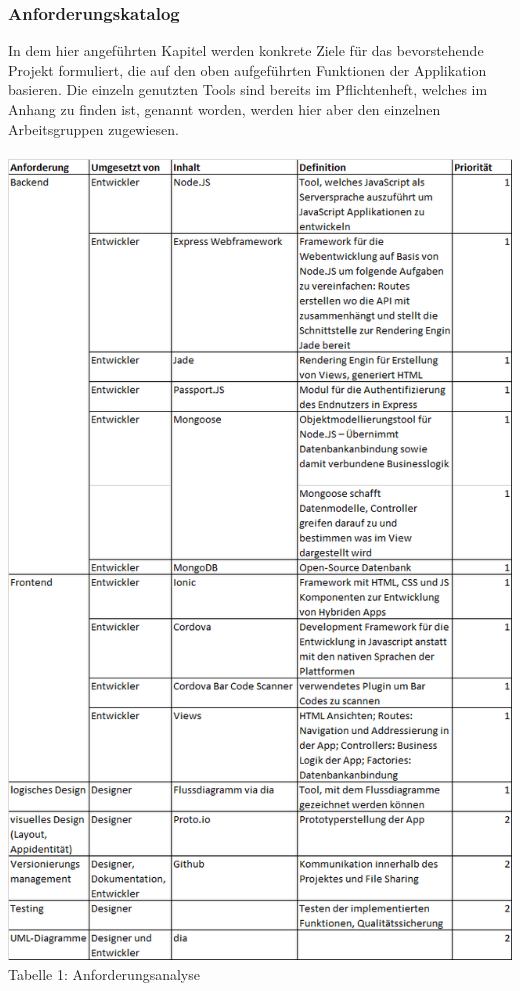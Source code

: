 \documentclass[12pt,a4paper]{article}
\begin{document}
\subsubsection{Anforderungskatalog}
In dem hier angeführten Kapitel werden konkrete Ziele für das bevorstehende Projekt formuliert, die auf den oben aufgeführten Funktionen der Applikation basieren.
Die einzeln genutzten Tools sind bereits im Pflichtenheft, welches im Anhang zu finden ist, genannt worden, werden hier aber den einzelnen Arbeitsgruppen zugewiesen.
\\
\\
\includegraphics[scale=0.59, origin=l]{Anforderungskatalog.png}
\\
\footnotesize Tabelle 1: Anforderungsanalyse
\normalsize
\\
\linebreak
\end{document}
